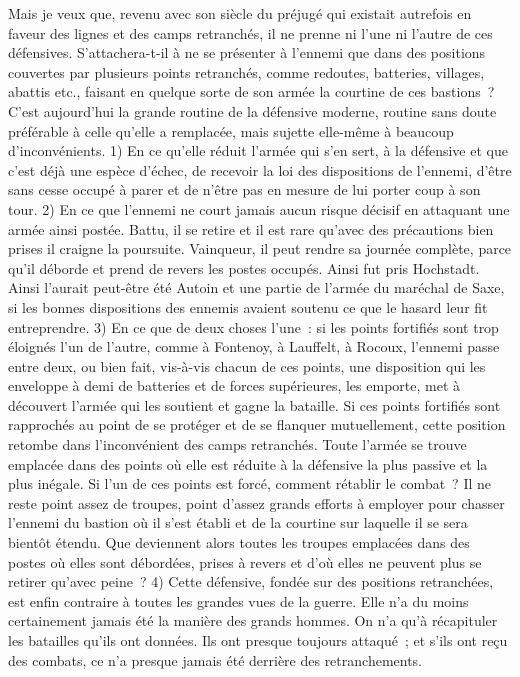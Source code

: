 \documentclass[french,twoside]{book} %
\begin{document}
Mais je veux que, revenu avec son siècle du préjugé qui existait autrefois en faveur des lignes et des camps retranchés, il ne prenne ni l’une ni l’autre de ces défensives. S’attachera-t-il à ne se présenter à l’ennemi que dans des positions couvertes par plusieurs points retranchés, comme redoutes, batteries, villages, abattis etc., faisant en quelque sorte de son armée la courtine de ces bastions ? C’est aujourd’hui la grande routine de la défensive moderne, routine sans doute préférable à celle qu’elle a remplacée, mais sujette elle-même à beaucoup d’inconvénients. 1) En ce qu’elle réduit l’armée qui s’en sert, à la défensive et que c’est déjà une espèce d’échec, de recevoir la loi des dispositions de l’ennemi, d’être sans cesse occupé à parer et de n’être pas en mesure de lui porter coup à son tour. 2) En ce que l’ennemi ne court jamais aucun risque décisif en attaquant une armée ainsi postée. Battu, il se retire et il est rare qu’avec des précautions bien prises il craigne la poursuite. Vainqueur, il peut rendre sa journée complète, parce qu’il déborde et prend de revers les postes occupés. Ainsi fut pris Hochstadt. Ainsi l’aurait peut-être été Autoin et une partie de l’armée du maréchal de Saxe, si les bonnes dispositions des ennemis avaient soutenu ce que le hasard leur fit entreprendre. 3) En ce que de deux choses l’une : si les points fortifiés sont trop éloignés l’un de l’autre, comme à Fontenoy, à Lauffelt, à Rocoux, l’ennemi passe entre deux, ou bien fait, vis-à-vis chacun de ces points, une disposition qui les enveloppe à demi de batteries et de forces supérieures, les emporte, met à découvert l’armée qui les soutient et gagne la bataille. Si ces points fortifiés sont rapprochés au point de se protéger et de se flanquer mutuellement, cette position retombe dans l’inconvénient des camps retranchés. Toute l’armée se trouve emplacée dans des points où elle est réduite à la défensive la plus passive et la plus inégale. Si l’un de ces points est forcé, comment rétablir le combat ? Il ne reste point assez de troupes, point d’assez grands efforts à employer pour chasser l’ennemi du bastion où il s’est établi et de la courtine sur laquelle il se sera bientôt étendu. Que deviennent alors toutes les troupes emplacées dans des postes où elles sont débordées, prises à revers et d’où elles ne peuvent plus se retirer qu’avec peine ? 4) Cette défensive, fondée sur des positions retranchées, est enfin contraire à toutes les grandes vues de la guerre. Elle n’a du moins certainement jamais été la manière des grands hommes. On n’a qu’à récapituler les batailles qu’ils ont données. Ils ont presque toujours attaqué ; et s’ils ont reçu des combats, ce n’a presque jamais été derrière des retranchements.\par
\end{document}
